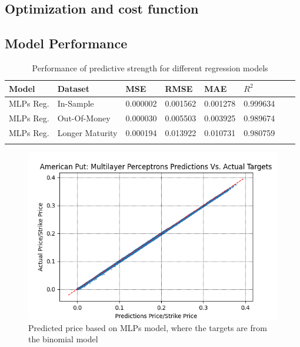 \subsection{Optimization and cost function}

\subsection{Model Performance}

\begin{table}[H]
\caption{Performance of predictive strength for different regression models}
\label{tab:euroPerformanceComparision}
\centering
\begin{tabular}{l l l l l l l l }
\toprule
\textbf{Model} & \textbf{Dataset} & \textbf{MSE} & \textbf{RMSE} & \textbf{MAE} & \textbf{$R^2$} \\
\midrule
MLPs Reg. & In-Sample & 0.000002 & 0.001562 & 0.001278 & 0.999634\\
MLPs Reg. & Out-Of-Money & 0.000030 & 0.005503 & 0.003925 & 0.989674\\
MLPs Reg. & Longer Maturity & 0.000194 & 0.013922 & 0.010731 & 0.980759\\
\bottomrule\\
\end{tabular}
\end{table}

\begin{figure}[H]
\centering
\includegraphics{Figures/PredictionAmerP.png}
\decoRule
\caption[MLPs Predictions Vs. Actual Prices For American Put]{Predicted price based on MLPs model, where the targets are from the binomial model}
\label{fig:PredictionAmerP}
\end{figure}

